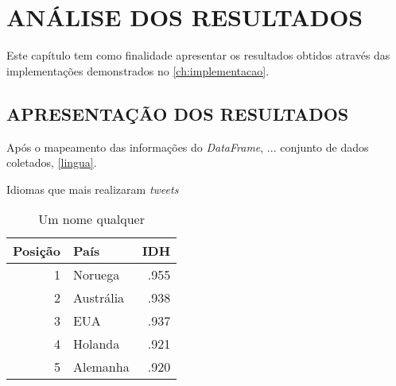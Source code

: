 
\chapter{ANÁLISE DOS RESULTADOS}\label{ch:resultados}

Este capítulo tem como finalidade apresentar os resultados obtidos através das implementações demonstrados no \autoref{ch:implementacao}.

\section{APRESENTAÇÃO DOS RESULTADOS}

Após o mapeamento das informações do \textit{DataFrame},  ... conjunto de dados coletados, \autoref{lingua}.

\begin{grafico}[h]
	\centering
	\caption{Idiomas que mais realizaram \textit{tweets}}
	\label{lingua}
\end{grafico}

\begin{table}[h]
\centering
\caption{Um nome qualquer}
\vspace{0.5cm}
\begin{tabular}{r|l|r}

Posição & País & IDH \\ %
\hline                               %
1 & Noruega        & .955 \\
2 & Austr{\'a}lia  & .938 \\
3 & EUA            & .937 \\
4 & Holanda        & .921 \\
5 & Alemanha       & .920            %

\end{tabular}
\end{table}









